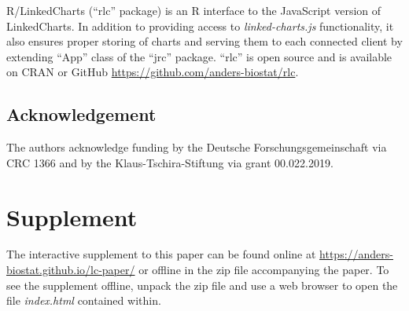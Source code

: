 \documentclass[twocolumn,10pt]{article}
\begin{document}
R/LinkedCharts (``rlc'' package) is an R \citep{R_2019} interface to the JavaScript version of LinkedCharts. In addition to providing access to \emph{linked-charts.js} functionality, it also ensures proper storing of charts and serving them to each connected client by extending ``App'' class of the ``jrc'' package. ``rlc'' is open source and is available on CRAN or GitHub \url{https://github.com/anders-biostat/rlc}.

\subsection{Acknowledgement}

The authors acknowledge funding by the Deutsche Forschungsgemeinschaft via CRC 1366 and by the Klaus-Tschira-Stiftung via grant 00.022.2019.

\section{Supplement}

The interactive supplement to this paper can be found online at \url{https://anders-biostat.github.io/lc-paper/} or offline in the zip file accompanying the paper. To see the supplement offline, unpack the zip file and use a web browser to open the file \emph{index.html} contained within.


\begin{small} 

\end{small}
\end{document}
